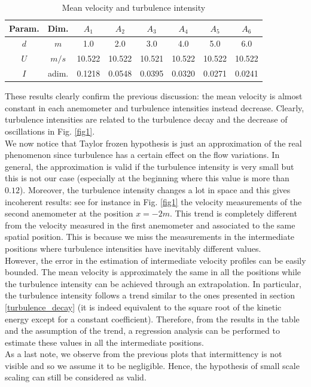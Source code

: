 \documentclass[11pt,titlepage]{article}
\begin{document}
\begin{table} [h]
\centering
\caption{Mean velocity and turbulence intensity} \label{table1}
    \begin{tabular}{ | c | c | c | c | c | c | c | c |}
        \hline
        Param. & Dim. & $A_1$ & $A_2$ & $A_3$ & $A_4$ & $A_5$ & $A_6$ \\
        \hline
        $d$ & $m$ & 1.0 & 2.0 & 3.0 & 4.0 & 5.0 & 6.0 \\
        \hline
        $U$ & $m/s$& 10.522 &10.522& 10.521 &10.522&  10.522&  10.522 \\
        \hline
        $I$ & adim.& 0.1218&  0.0548&  0.0395&0.0320 & 0.0271& 0.0241 \\
        \hline
    \end{tabular}
\end{table}
These results clearly confirm the previous discussion: the mean velocity is almost constant in each anemometer and turbulence intensities instead decrease. Clearly, turbulence intensities are related to the turbulence decay and the decrease of oscillations in Fig. \ref{fig1}. \\
We now notice that Taylor frozen hypothesis is just an approximation of the real phenomenon since turbulence has a certain effect on the flow variations. In general, the approximation is valid if the turbulence intensity is very small but this is not our case (especially at the beginning where this value is more than $0.12$). Moreover, the turbulence intensity changes a lot in space and this gives incoherent results: see for instance in Fig. \ref{fig1} the velocity measurements of the second anemometer at the position $x=-2m$. This trend is completely different from the velocity measured in the first anemometer and associated to the same spatial position. This is because we miss the measurements in the intermediate positions where turbulence intensities have inevitably different values. \\
However, the error in the estimation of intermediate velocity profiles can be easily bounded. The mean velocity is approximately the same in all the positions while the turbulence intensity can be achieved through an extrapolation. In particular, the turbulence intensity follows a trend similar to the ones presented in section \ref{turbulence_decay} (it is indeed equivalent to the square root of the kinetic energy except for a constant coefficient). Therefore, from the results in the table and the assumption of the trend, a regression analysis can be performed to estimate these values in all the intermediate positions. \\
As a last note, we observe from the previous plots that intermittency is not visible and so we assume it to be negligible. Hence, the hypothesis of small scale scaling can still be considered as valid.
\end{document}
